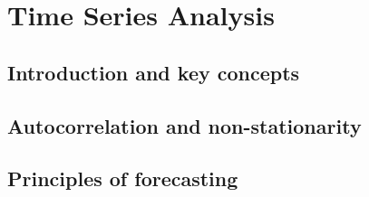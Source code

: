 \chapter{Time Series Analysis}\label{chap_TimeSeries}
\section{Introduction and key concepts}
\section{Autocorrelation and non-stationarity}
\section{Principles of forecasting}



\renewcommand\bibname{Further reading}
\begin{subappendices}


\end{subappendices} 